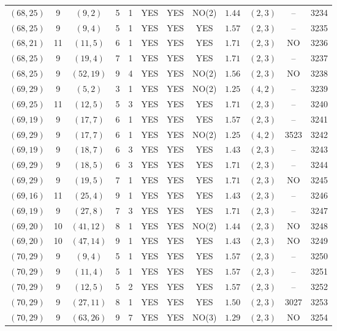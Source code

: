 \begin{longtable}{|c|c|c|c|c|c|c|c|c|c|c|c|}
$(68,25)$ & 9 & $(9,2)$ & 5 & 1 & YES & YES & NO(2) & $1.44$ & $(2,3)$ & -- & 3234\\
$(68,25)$ & 9 & $(9,4)$ & 5 & 1 & YES & YES & YES & $1.57$ & $(2,3)$ & -- & 3235\\
$(68,21)$ & 11 & $(11,5)$ & 6 & 1 & YES & YES & YES & $1.71$ & $(2,3)$ & NO & 3236\\
$(68,25)$ & 9 & $(19,4)$ & 7 & 1 & YES & YES & YES & $1.71$ & $(2,3)$ & -- & 3237\\
$(68,25)$ & 9 & $(52,19)$ & 9 & 4 & YES & YES & NO(2) & $1.56$ & $(2,3)$ & NO & 3238\\
$(69,29)$ & 9 & $(5,2)$ & 3 & 1 & YES & YES & NO(2) & $1.25$ & $(4,2)$ & -- & 3239\\
$(69,25)$ & 11 & $(12,5)$ & 5 & 3 & YES & YES & YES & $1.71$ & $(2,3)$ & -- & 3240\\
$(69,19)$ & 9 & $(17,7)$ & 6 & 1 & YES & YES & YES & $1.57$ & $(2,3)$ & -- & 3241\\
$(69,29)$ & 9 & $(17,7)$ & 6 & 1 & YES & YES & NO(2) & $1.25$ & $(4,2)$ & 3523 & 3242\\
$(69,19)$ & 9 & $(18,7)$ & 6 & 3 & YES & YES & YES & $1.43$ & $(2,3)$ & -- & 3243\\
$(69,29)$ & 9 & $(18,5)$ & 6 & 3 & YES & YES & YES & $1.71$ & $(2,3)$ & -- & 3244\\
$(69,29)$ & 9 & $(19,5)$ & 7 & 1 & YES & YES & YES & $1.71$ & $(2,3)$ & NO & 3245\\
$(69,16)$ & 11 & $(25,4)$ & 9 & 1 & YES & YES & YES & $1.43$ & $(2,3)$ & -- & 3246\\
$(69,19)$ & 9 & $(27,8)$ & 7 & 3 & YES & YES & YES & $1.71$ & $(2,3)$ & -- & 3247\\
$(69,20)$ & 10 & $(41,12)$ & 8 & 1 & YES & YES & NO(2) & $1.44$ & $(2,3)$ & NO & 3248\\
$(69,20)$ & 10 & $(47,14)$ & 9 & 1 & YES & YES & YES & $1.43$ & $(2,3)$ & NO & 3249\\
$(70,29)$ & 9 & $(9,4)$ & 5 & 1 & YES & YES & YES & $1.57$ & $(2,3)$ & -- & 3250\\
$(70,29)$ & 9 & $(11,4)$ & 5 & 1 & YES & YES & YES & $1.57$ & $(2,3)$ & -- & 3251\\
$(70,29)$ & 9 & $(12,5)$ & 5 & 2 & YES & YES & YES & $1.57$ & $(2,3)$ & -- & 3252\\
$(70,29)$ & 9 & $(27,11)$ & 8 & 1 & YES & YES & YES & $1.50$ & $(2,3)$ & 3027 & 3253\\
$(70,29)$ & 9 & $(63,26)$ & 9 & 7 & YES & YES & NO(3) & $1.29$ & $(2,3)$ & NO & 3254\\

\end{longtable}
